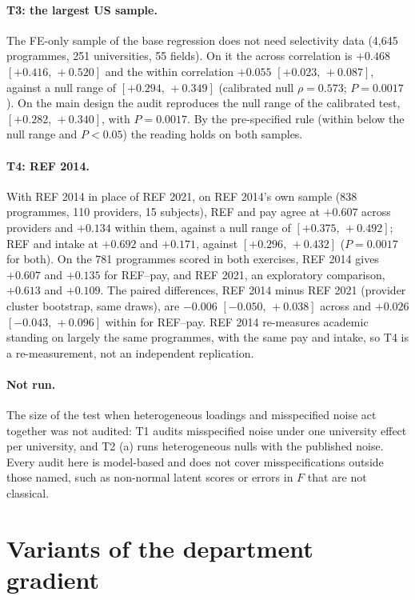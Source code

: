 \documentclass[11pt]{article}
\newcommand{\ci}[2]{$[#1,\allowbreak\,#2]$}
\begin{document}
\paragraph{T3: the largest US sample.} The FE-only sample of the base regression does not need selectivity data
(4,645 programmes, 251 universities, 55 fields). On it the across correlation is $+0.468$ \ci{+0.416}{+0.520} and the
within correlation $+0.055$ \ci{+0.023}{+0.087}, against a null range of \ci{+0.294}{+0.349} (calibrated null
$\rho=0.573$; $P=0.0017$). On the main design the audit reproduces the null range of the calibrated test,
\ci{+0.282}{+0.340}, with $P=0.0017$. By the pre-specified rule (within below the null range and $P<0.05$) the
reading holds on both samples.

\paragraph{T4: REF 2014.} With REF 2014 in place of REF 2021, on REF 2014's own sample (838 programmes, 110
providers, 15 subjects), REF and pay agree at $+0.607$ across providers and $+0.134$ within them, against a null range
of \ci{+0.375}{+0.492}; REF and intake at $+0.692$ and $+0.171$, against \ci{+0.296}{+0.432} ($P=0.0017$ for both).
On the 781 programmes scored in both exercises, REF 2014 gives $+0.607$ and $+0.135$ for REF--pay, and REF 2021, an
exploratory comparison, $+0.613$ and $+0.109$. The paired differences, REF 2014 minus REF 2021 (provider cluster
bootstrap, same draws), are $-0.006$ \ci{-0.050}{+0.038} across and $+0.026$ \ci{-0.043}{+0.096} within for
REF--pay. REF 2014 re-measures academic standing on largely the same programmes, with the same pay and intake, so T4
is a re-measurement, not an independent replication.

\paragraph{Not run.} The size of the test when heterogeneous loadings and misspecified noise act together was not
audited: T1 audits misspecified noise under one university effect per university, and T2 (a) runs heterogeneous nulls
with the published noise. Every audit here is model-based and does not cover misspecifications outside those named,
such as non-normal latent scores or errors in $F$ that are not classical.

\section{Variants of the department gradient}\label{sec:si-slope}
\end{document}
